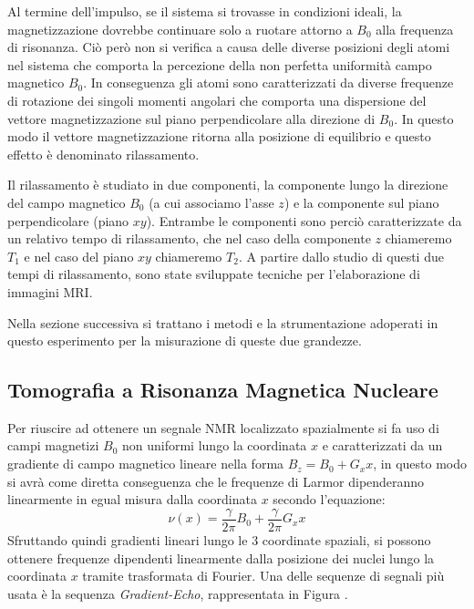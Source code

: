 Al termine dell'impulso, se il sistema si trovasse in condizioni ideali, la magnetizzazione dovrebbe continuare solo a ruotare attorno a $B_0$ alla frequenza di risonanza. 
Ciò però non si verifica a causa delle diverse posizioni degli atomi nel sistema che comporta la percezione della non perfetta uniformità campo magnetico $B_0$. 
In conseguenza gli atomi sono caratterizzati da diverse frequenze di rotazione dei singoli momenti angolari che comporta una dispersione del vettore magnetizzazione sul piano perpendicolare alla direzione di $B_0$.
In questo modo il vettore magnetizzazione ritorna alla posizione di equilibrio e questo effetto è denominato rilassamento.

Il rilassamento è studiato in due componenti, la componente lungo la direzione del campo magnetico $B_0$ (a cui associamo l'asse $z$) e la componente sul piano perpendicolare (piano $xy$). 
Entrambe le componenti sono perciò caratterizzate da un relativo tempo di rilassamento, che nel caso della componente $z$ chiameremo $T_1$ e nel caso del piano $xy$ chiameremo $T_2$.
A partire dallo studio di questi due tempi di rilassamento, sono state sviluppate tecniche per l'elaborazione di immagini MRI.

Nella sezione successiva si trattano i metodi e la strumentazione adoperati in questo esperimento per la misurazione di queste due grandezze.

\subsection*{Tomografia a Risonanza Magnetica Nucleare}

Per riuscire ad ottenere un segnale NMR localizzato spazialmente si fa uso di campi magnetizi $B_0$ non uniformi lungo la coordinata $x$ e caratterizzati da un gradiente di campo magnetico lineare nella forma $B_z = B_0 + G_x x$, in questo modo si avrà come diretta conseguenza che le frequenze di Larmor dipenderanno linearmente in egual misura dalla coordinata $x$ secondo l'equazione:
\begin{equation}
	\nu(x) = \frac{\gamma}{2\pi}B_0 + \frac{\gamma}{2\pi}G_x x
\end{equation}
Sfruttando quindi gradienti lineari lungo le 3 coordinate spaziali, si possono ottenere frequenze dipendenti linearmente dalla posizione dei nuclei lungo la coordinata $x$ tramite trasformata di Fourier. Una delle sequenze di segnali più usata è la sequenza \textit{Gradient-Echo}, rappresentata in Figura .

